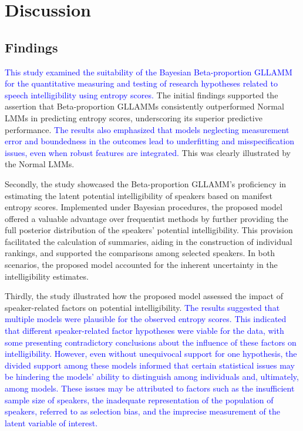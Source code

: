 \documentclass[
  authoryear,
  preprint,
  1p]{elsarticle}
\begin{document}
\section{Discussion}\label{sec-discussion}

\subsection{Findings}\label{sec-D-F}

\textcolor{blue}{This study examined the suitability of the Bayesian Beta-proportion
GLLAMM for the quantitative measuring and testing of research hypotheses
related to speech intelligibility using entropy scores.} The initial
findings supported the assertion that Beta-proportion GLLAMMs
consistently outperformed Normal LMMs in predicting entropy scores,
underscoring its superior predictive performance. \textcolor{blue}{The results also
emphasized that models neglecting measurement error and boundedness in
the outcomes lead to underfitting and misspecification issues, even when
robust features are integrated.} This was clearly illustrated by the
Normal LMMs.

Secondly, the study showcased the Beta-proportion GLLAMM's proficiency
in estimating the latent potential intelligibility of speakers based on
manifest entropy scores. Implemented under Bayesian procedures, the
proposed model offered a valuable advantage over frequentist methods by
further providing the full posterior distribution of the speakers'
potential intelligibility. This provision facilitated the calculation of
summaries, aiding in the construction of individual rankings, and
supported the comparisons among selected speakers. In both scenarios,
the proposed model accounted for the inherent uncertainty in the
intelligibility estimates.

Thirdly, the study illustrated how the proposed model assessed the
impact of speaker-related factors on potential intelligibility. \textcolor{blue}{The
results suggested that multiple models were plausible for the observed
entropy scores. This indicated that different speaker-related factor
hypotheses were viable for the data, with some presenting contradictory
conclusions about the influence of these factors on intelligibility.
However, even without unequivocal support for one hypothesis, the
divided support among these models informed that certain statistical
issues may be hindering the models' ability to distinguish among
individuals and, ultimately, among models. These issues may be
attributed to factors such as the insufficient sample size of speakers,
the inadequate representation of the population of speakers, referred to
as selection bias, and the imprecise measurement of the latent variable
of interest.}
\end{document}
